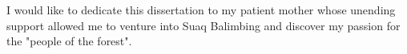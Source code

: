 
\begin{dedication} 

I would like to dedicate this dissertation to my patient mother whose unending support allowed me to venture into Suaq Balimbing and discover my passion for the "people of the forest".

\end{dedication}